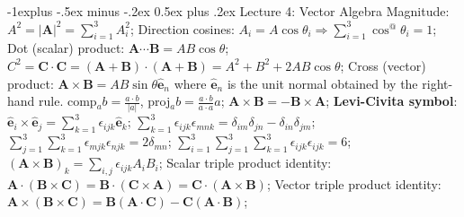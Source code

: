 \documentclass[10pt,landscape]{article}
\makeatletter
\renewcommand{\subsection}{\@startsection{subsection}{2}{0mm}%
                                {-1explus -.5ex minus -.2ex}%
                                {0.5ex plus .2ex}%
                                {\normalfont\normalsize\bfseries}}
\makeatother
\begin{document}
\begin{multicols}{3}
\subsection{Lecture 4: Vector Algebra}
Magnitude: $A^2 = |\mathbf{A}|^2 = \sum_{i=1}^3 A_i^2$;
Direction cosines: $A_i = A\cos\theta_i \Rightarrow \sum_{i=1}^3 \cos^@\theta_i = 1$;
Dot (scalar) product: $\mathbf{A} \cdots \mathbf{B} = AB\cos\theta$;
$C^2 = \mathbf{C} \cdot \mathbf{C} = (\mathbf{A} + \mathbf{B}) \cdot
	(\mathbf{A} + \mathbf{B}) = A^2 + B^2 + 2AB\cos\theta$;
Cross (vector) product: $\mathbf{A} \times \mathbf{B} = AB\sin\theta
	\hat{\mathbf{e}}_n$ where $\hat{\mathbf{e}}_n$ is the unit normal obtained
	by the right-hand rule.
comp$_a b = \frac{a \cdot b}{|a|}$, proj$_a b = \frac{a \cdot b}{a \cdot a} a$;
$\mathbf{A} \times \mathbf{B} = - \mathbf{B} \times \mathbf{A}$;
\textbf{Levi-Civita symbol}: $\hat{\mathbf{e}}_i \times \hat{\mathbf{e}}_j
	= \sum_{k=1}^3 \epsilon_{ijk} \hat{\mathbf{e}}_k$;
$\sum_{k=1}^3 \epsilon_{ijk} \epsilon_{mnk} = \delta_{im} \delta_{jn} - 
	\delta_{in} \delta_{jm}$;
$\sum_{j=1}^3 \sum_{k=1}^3 \epsilon_{mjk} \epsilon_{njk} = 2\delta_{mn}$;
$\sum_{i=1}^3 \sum_{j=1}^3 \sum_{k=1}^3 \epsilon_{ijk} \epsilon_{ijk} = 6$;
$(\mathbf{A} \times \mathbf{B})_k = \sum_{i,j} \epsilon_{ijk} A_i B_i$;
Scalar triple product identity: 
$\mathbf{A} \cdot (\mathbf{B} \times \mathbf{C}) = \mathbf{B} \cdot (\mathbf{C}
	\times \mathbf{A}) = \mathbf{C} \cdot (\mathbf{A} \times \mathbf{B})$;
Vector triple product identity: 
$\mathbf{A} \times (\mathbf{B} \times \mathbf{C}) = \mathbf{B} (\mathbf{A}
	\cdot \mathbf{C}) - \mathbf{C} (\mathbf{A} \cdot \mathbf{B})$;


\end{multicols}
\end{document}
